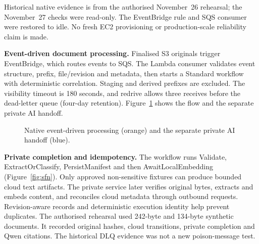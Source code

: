 Historical native evidence is from the authorised November~26 rehearsal; the November~27 checks were read-only. The EventBridge rule and SQS consumer were restored to idle. No fresh EC2 provisioning or production-scale reliability claim is made.

\textbf{Event-driven document processing.} Finalised S3 originals trigger EventBridge, which routes events to SQS. The Lambda consumer validates event structure, prefix, file/revision and metadata, then starts a Standard workflow with deterministic correlation. Staging and derived prefixes are excluded. The visibility timeout is 180 seconds, and redrive allows three receives before the dead-letter queue (four-day retention). Figure~\ref{fig:events} shows the flow and the separate private AI handoff.

\begin{figure}[htbp]
\centering
{}
\caption{Native event-driven processing (orange) and the separate private AI handoff (blue).}
\label{fig:events}
\end{figure}

\textbf{Private completion and idempotency.} The workflow runs Validate, ExtractOrClassify, PersistManifest and then AwaitLocalEmbedding (Figure~\ref{fig:sfn}). Only approved non-sensitive fixtures can produce bounded cloud text artifacts. The private service later verifies original bytes, extracts and embeds content, and reconciles cloud metadata through outbound requests. Revision-aware records and deterministic execution identity help prevent duplicates. The authorised rehearsal used 242-byte and 134-byte synthetic documents. It recorded original hashes, cloud transitions, private completion and Qwen citations. The historical DLQ evidence was not a new poison-message test.

